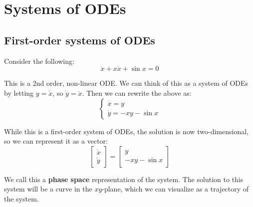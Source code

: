\chapter{Systems of ODEs}

\section{First-order systems of ODEs}
Consider the following:
\begin{equation*}
\ddot{x} + x \dot{x} + \sin x = 0
\end{equation*}

This is a 2nd order, non-linear ODE. We can think of this as a system of ODEs by letting $y = \dot{x}$, so $\dot{y} = \ddot{x}$. Then we can rewrite the above as:
\begin{equation*}
\begin{cases}
\dot{x} = y \\
\dot{y} = -x y - \sin x
\end{cases}
\end{equation*}

While this is a first-order system of ODEs, the solution is now two-dimensional, so we can represent it as a vector:
\begin{equation*}
\begin{bmatrix}
\dot{x} \\
\dot{y}
\end{bmatrix} =
\begin{bmatrix}y \\
-x y - \sin x
\end{bmatrix}
\end{equation*}

We call this a \textbf{phase space} representation of the system. The solution to this system will be a curve in the $xy$-plane, which we can visualize as a trajectory of the system.


